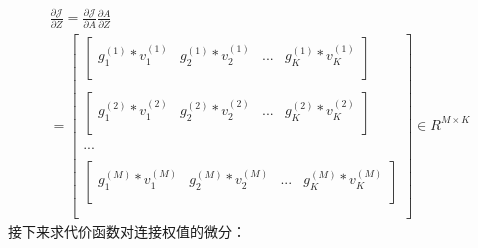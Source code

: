 \documentclass[UTF8]{article}
\begin{document}
\begin{equation}
\begin{aligned}
\frac{\partial{\mathcal{J}}}{\partial{Z}}=\frac{\partial{\mathcal{J}}}{\partial{A}} \frac{\partial{A}}{\partial{Z}} \\
 =\begin{bmatrix}
 \begin{bmatrix}
 g_{1}^{(1)}*v_{1}^{(1)} & g_{2}^{(1)}*v_{2}^{(1)} & ... & g_{K}^{(1)}*v_{K}^{(1)} \\
 \end{bmatrix} \\ \\
 \begin{bmatrix}
 g_{1}^{(2)}*v_{1}^{(2)} & g_{2}^{(2)}*v_{2}^{(2)} & ... & g_{K}^{(2)}*v_{K}^{(2)} \\
 \end{bmatrix} \\ \\
 ... \\ \\
 \begin{bmatrix}
 g_{1}^{(M)}*v_{1}^{(M)} & g_{2}^{(M)}*v_{2}^{(M)} & ... & g_{K}^{(M)}*v_{K}^{(M)} \\
 \end{bmatrix} \\ \\
 \end{bmatrix} \in R^{M \times K}
\end{aligned}
\label{mlp-leaky-relu-pJ-pZ-def}
\end{equation}
接下来求代价函数对连接权值的微分：
\end{document}

